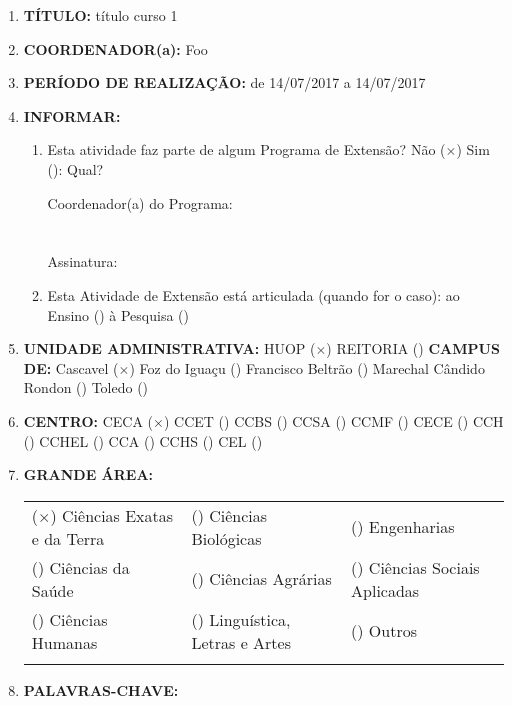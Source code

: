 \documentclass[12pt,a4paper,oneside]{article}%
\begin{document}
\begin{enumerate}%
\item%
\textbf{TÍTULO: }%
título curso 1%
\item%
\textbf{COORDENADOR(a): }%
Foo%
\item%
\textbf{PERÍODO DE REALIZAÇÃO: }%
de 14/07/2017 a 14/07/2017%
\item%
\textbf{INFORMAR: }%
\begin{mdframed}[innertopmargin=5pt, innerleftmargin=3pt, innerrightmargin=3pt]%
\begin{enumerate}%
\scriptsize%
\item%
Esta atividade faz parte de algum Programa de Extensão? %
Não ($\times$) Sim (): Qual? %

            Coordenador(a) do Programa: \\ \\ \\
            Assinatura: \hrulefill \\
\item%
Esta Atividade de Extensão está articulada (quando for o caso): ao Ensino () à Pesquisa ()%
\end{enumerate}%
\end{mdframed}%
\item%
\textbf{UNIDADE ADMINISTRATIVA: }%
HUOP ($\times$) %
REITORIA () %
\newline%
\textbf{CAMPUS DE: }%
Cascavel ($\times$) %
Foz do Iguaçu () %
Francisco Beltrão () %
Marechal Cândido Rondon () %
Toledo () %
\item%
\textbf{CENTRO: }%
\newline%
CECA ($\times$) %
CCET () %
CCBS () %
CCSA () %
CCMF () %
CECE () %
CCH () %
CCHEL () %
CCA () %
CCHS () %
CEL () %
\item%
\textbf{GRANDE ÁREA: }%
\newline%
\begin{tabularx}{\linewidth}{|X|X|X|}%
\hline%
($\times$) Ciências Exatas e da Terra&() Ciências Biológicas&() Engenharias\\%
() Ciências da Saúde&() Ciências Agrárias&() Ciências Sociais Aplicadas\\%
() Ciências Humanas&() Linguística, Letras e Artes&() Outros\\%
&&\\%
\hline%
\end{tabularx}%
\item%
\textbf{PALAVRAS{-}CHAVE: }%
\newline%
\begin{tabularx}{\linewidth}{|X|X|X|}%

\end{tabularx}
\end{enumerate}
\end{document}

